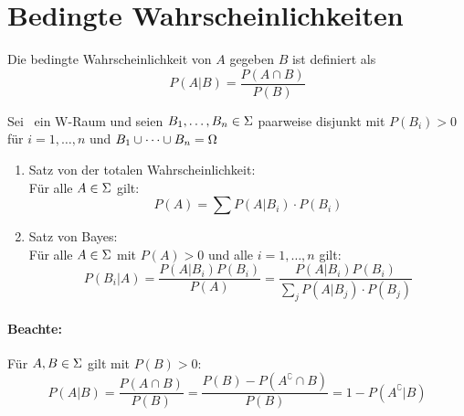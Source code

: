 \section{Bedingte Wahrscheinlichkeiten}
Die bedingte Wahrscheinlichkeit von $A$ gegeben $B$ ist definiert als
\begin{equation}
    P(A|B) = \frac{P(A\cap B)}{P(B)}
\end{equation}

\begin{theorem}
    Sei \wraum\ ein W-Raum und seien $B_1, \dots, B_n \in \Sigma$ paarweise
    disjunkt mit $P(B_i) > 0$ für $i=1, \dots, n$ und
    $B_1 \cup \dots \cup B_n = \Omega$
    \begin{enumerate}
        \item Satz von der totalen Wahrscheinlichkeit:\\
              Für alle $A \in \Sigma$ gilt:
              \begin{equation*}
                  P(A) = \sum P(A|B_i) \cdot P(B_i)
              \end{equation*}
        \item Satz von Bayes:\\
              Für alle $A \in \Sigma$ mit $P(A) > 0$ und alle $i=1, \dots, n$ gilt:
              \begin{equation*}
                  P(B_i|A)
                  = \frac{P(A|B_i) P(B_i)}{P(A)}
                  = \frac{P(A|B_i) P(B_i)}{\sum_j P(A|B_j) \cdot P(B_j)}
              \end{equation*}
    \end{enumerate}
\end{theorem}

\paragraph{Beachte:}
Für $A,B \in \Sigma$ gilt mit $P(B)>0$:
\begin{equation*}
    P(A|B) = \frac{P(A \cap B)}{P(B)}
    = \frac{P(B) - P(A^\complement \cap B)}{P(B)}
    = 1 - P(A^\complement | B)
\end{equation*}

